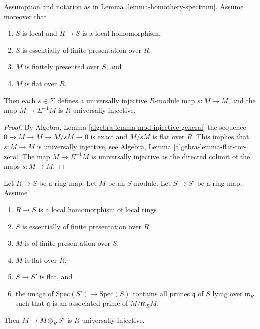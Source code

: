 \begin{lemma}
\label{lemma-homothety-universally-injective}
Assumption and notation as in
Lemma \ref{lemma-homothety-spectrum}.
Assume moreover that
\begin{enumerate}
\item $S$ is local and $R \to S$ is a local homomorphism,
\item $S$ is essentially of finite presentation over $R$,
\item $M$ is finitely presented over $S$, and
\item $M$ is flat over $R$.
\end{enumerate}
Then each $s \in \Sigma$ defines a
universally injective $R$-module map $s : M \to M$, and the
map $M \to \Sigma^{-1}M$ is $R$-universally injective.
\end{lemma}

\begin{proof}
By
Algebra, Lemma \ref{algebra-lemma-mod-injective-general}
the sequence $0 \to M \to M \to M/sM \to 0$ is exact and
$M/sM$ is flat over $R$. This implies that $s : M \to M$
is universally injective, see
Algebra, Lemma \ref{algebra-lemma-flat-tor-zero}.
The map $M \to \Sigma^{-1}M$ is universally injective as the directed
colimit of the maps $s : M \to M$.
\end{proof}

\begin{lemma}
\label{lemma-base-change-universally-flat-local}
Let $R \to S$ be a ring map.
Let $M$ be an $S$-module.
Let $S \to S'$ be a ring map.
Assume
\begin{enumerate}
\item $R \to S$ is a local homomorphism of local rings
\item $S$ is essentially of finite presentation over $R$,
\item $M$ is of finite presentation over $S$,
\item $M$ is flat over $R$,
\item $S \to S'$ is flat, and
\item the image of $\text{Spec}(S') \to \text{Spec}(S)$ contains
all primes $\mathfrak q$ of $S$ lying over $\mathfrak m_R$
such that $\mathfrak q$ is an associated prime of $M/\mathfrak m_R M$.
\end{enumerate}
Then $M \to M \otimes_R S'$ is $R$-universally injective.
\end{lemma}

